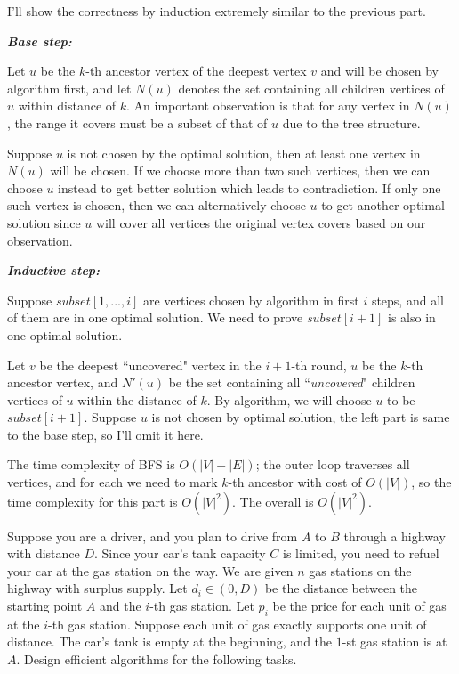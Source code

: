 \documentclass{oxmathproblems}
\begin{document}
\begin{questions}
\begin{Solution}
I'll show the correctness by induction extremely similar to the previous part.

\textit{\textbf{Base step:}}

Let $u$ be the $k$-th ancestor vertex of the deepest vertex $v$ and will be chosen by algorithm first, and let $N(u)$ denotes the set containing all children vertices of $u$ within distance of $k$. An important observation is that for any vertex in $N(u)$, the range it covers must be a subset of that of $u$ due to the tree structure. 

Suppose $u$ is not chosen by the optimal solution, then at least one vertex in $N(u)$ will be chosen. If we choose more than two such vertices, then we can choose $u$ instead to get better solution which leads to contradiction. If only one such vertex is chosen, then we can alternatively choose $u$ to get another optimal solution since $u$ will cover all vertices the original vertex covers based on our observation.

\textbf{\textit{Inductive step:}}

Suppose $subset[1, ..., i]$ are vertices chosen by algorithm in first $i$ steps, and all of them are in one optimal solution. We need to prove $subset[i+1]$ is also in one optimal solution.

Let $v$ be the deepest ``uncovered" vertex in the $i+1$-th round, $u$ be the $k$-th ancestor vertex, and $N'(u)$ be the set containing all ``\textit{uncovered}" children vertices of $u$ within the distance of $k$. By algorithm, we will choose $u$ to be $subset[i+1]$. Suppose $u$ is not chosen by optimal solution, the left part is same to the base step, so I'll omit it here.

\vspace{0.5cm}
The time complexity of BFS is $O(|V|+|E|)$; the outer loop traverses all vertices, and for each we need to mark $k$-th ancestor with cost of $O(|V|)$, so the time complexity for this part is $O(|V|^2)$. The overall is $O(|V|^2)$.

\end{Solution}
\newpage

\miquestion[25]
Suppose you are a driver, and you plan to drive from $A$ to $B$ through a highway with distance $D$. 
Since your car's tank capacity $C$ is limited, you need to refuel your car at the gas station on the way. 
We are given $n$ gas stations on the highway with surplus supply. 
Let $d_i\in(0,D)$ be the distance between the starting point $A$ and the $i$-th gas station.
Let $p_i$ be the price for each unit of gas at the $i$-th gas station.
Suppose each unit of gas exactly supports one unit of distance. 
The car's tank is empty at the beginning, and the $1$-st gas station is at $A$. 
Design efficient algorithms for the following tasks.
\begin{parts}

\end{parts}
\end{questions}
\end{document}
